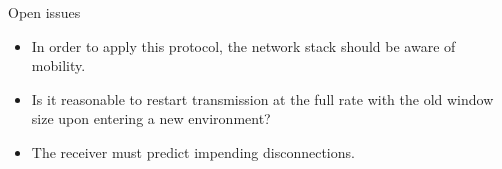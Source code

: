 \begin{frame}{Open issues}
       \begin{itemize}
		 \item In order to apply this protocol, the network stack
		       should be aware of mobility.
		 \item Is it reasonable to restart transmission at the full rate 
		       with the old window size upon entering a new environment?
		\item  The receiver must predict impending disconnections.
       \end{itemize}
\end{frame}

